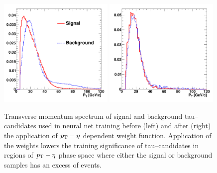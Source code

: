 \begin{figure}[thbp]
\setlength{\unitlength}{1mm}
\begin{center}
\includegraphics*[width=0.49\textwidth]{tanc_chapter/figures/training_weights_unweighted.pdf}
\includegraphics*[width=0.49\textwidth]{tanc_chapter/figures/training_weights_weighted.pdf}
\caption[Kinematic weighting of training sample]{Transverse momentum spectrum of
signal and background tau--candidates used in neural net training before (left)
and after (right) the application of \mbox{$p_{\mathrm{T}}-\eta$} dependent weight function.
Application of the weights lowers the training significance of tau--candidates
in regions of \mbox{$p_{\mathrm{T}}-\eta$} phase space where either the signal or background
samples has an excess of events. } \label{fig:nnTrainingWeights}
\end{center}
\end{figure} 

